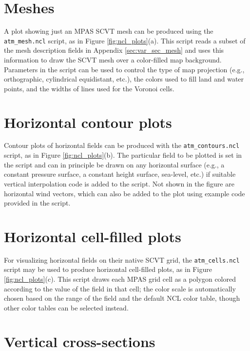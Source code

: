 \section{Meshes}

A plot showing just an MPAS SCVT mesh can be produced using the {\tt atm\_mesh.ncl} script, as in Figure \ref{fig:ncl_plots}(a). This script
reads a subset of the mesh description fields in Appendix \ref{sec:var_sec_mesh} and uses this information to draw the SCVT mesh over a 
color-filled map background. Parameters in the script can be used to control the type of map projection (e.g., orthographic, cylindrical equidistant, etc.), 
the colors used to fill land and water points, and the widths of lines used for the Voronoi cells.


\section{Horizontal contour plots}

Contour plots of horizontal fields can be produced with the {\tt atm\_contours.ncl} script, as in Figure \ref{fig:ncl_plots}(b). The particular
field to be plotted is set in the script and can in principle be drawn on any horizontal surface (e.g., a constant pressure
surface, a constant height surface, sea-level, etc.) if suitable vertical interpolation code is added to the script. Not shown in the figure are horizontal
wind vectors, which can also be added to the plot using example code provided in the script.


\section{Horizontal cell-filled plots}

For visualizing horizontal fields on their native SCVT grid, the {\tt atm\_cells.ncl} script may be used to produce horizontal cell-filled plots, 
as in Figure \ref{fig:ncl_plots}(c). This script draws each MPAS grid cell as a polygon colored according to the value of the field in that
cell; the color scale is automatically chosen based on the range of the field and the default NCL color table, though other color tables can
be selected instead.


\section{Vertical cross-sections}

